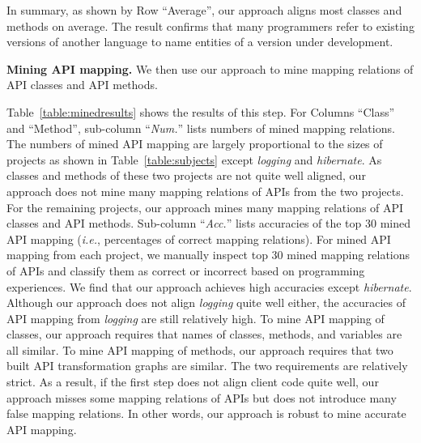 In summary, as shown by Row ``Average'', our approach aligns most
classes and methods on average. The result confirms that many
programmers refer to existing versions of another language to name
entities of a version under development.

\textbf{Mining API mapping.} We then use our approach to mine
mapping relations of API classes and API methods.

Table~\ref{table:minedresults} shows the results of this step. For
Columns ``Class'' and ``Method'', sub-column ``\emph{Num.}'' lists
numbers of mined mapping relations. The numbers of mined API mapping
are largely proportional to the sizes of projects as shown in
Table~\ref{table:subjects} except \emph{logging} and
\emph{hibernate}. As classes and methods of these two projects are
not quite well aligned, our approach does not mine many mapping
relations of APIs from the two projects. For the remaining projects,
our approach mines many mapping relations of API classes and API
methods. Sub-column ``\emph{Acc.}'' lists accuracies of the top 30
mined API mapping (\emph{i.e.}, percentages of correct mapping
relations). For mined API mapping from each project, we manually
inspect top 30 mined mapping relations of APIs and classify them as
correct or incorrect based on programming experiences. We find that
our approach achieves high accuracies except \emph{hibernate}.
Although our approach does not align \emph{logging} quite well
either, the accuracies of API mapping from \emph{logging} are still
relatively high. To mine API mapping of classes, our approach
requires that names of classes, methods, and variables are all
similar. To mine API mapping of methods, our approach requires that
two built API transformation graphs are similar. The two
requirements are relatively strict. As a result, if the first step
does not align client code quite well, our approach misses some
mapping relations of APIs but does not introduce many false mapping
relations. In other words, our approach is robust to mine accurate
API mapping.



